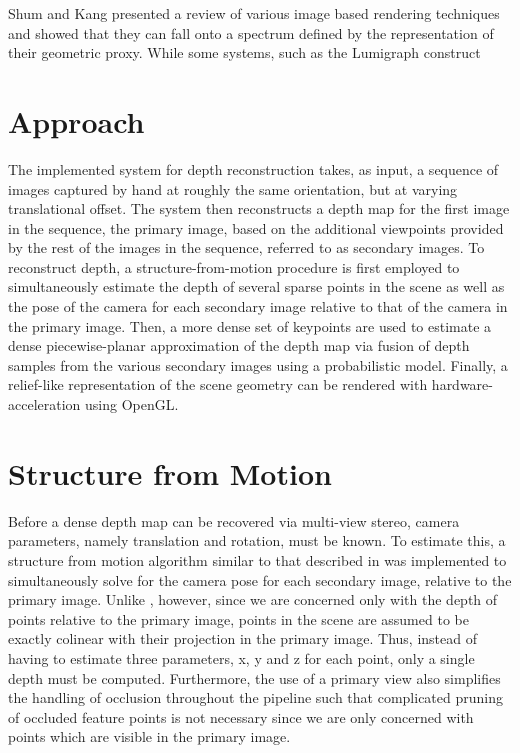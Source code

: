 \documentclass[conference]{acmsiggraph}
\begin{document}
Shum and Kang  presented a review of various image based
rendering techniques and showed that they can fall onto a spectrum defined
by the representation of their geometric proxy.  While some systems,
such as the Lumigraph \cite{gortler1996lumigraph} construct 

\section{Approach}

The implemented system for depth reconstruction takes, as input, a sequence
of images captured by hand at roughly the same orientation, but at varying
translational offset.  The system then reconstructs a depth map for the
first image in the sequence, the primary image, based on the additional
viewpoints provided by the rest of the images in the sequence,
referred to as secondary images.
To reconstruct depth, a structure-from-motion
procedure is first employed to simultaneously estimate the depth of several
sparse points in the scene as well as the pose of the camera
for each secondary image relative to that of the camera in the primary image.
Then, a more dense set of keypoints are used to 
estimate a dense piecewise-planar approximation of the depth map
via fusion of depth samples from the various secondary images using
a probabilistic model.
Finally, a relief-like representation of the scene geometry can be rendered
with hardware-acceleration using OpenGL.


% 

\section{Structure from Motion}

Before a dense depth map can be recovered via multi-view stereo,
camera parameters, namely translation and rotation, must be known.
To estimate this, a structure from motion algorithm similar to that
described in \cite{snavely2006photo} was implemented to
simultaneously solve for the camera pose for each secondary image,
relative to the primary image.
Unlike \cite{snavely2006photo}, however, since we are concerned
only with the depth of points relative to the primary image,
points in the scene are assumed to be exactly colinear with
their projection in the primary image.  Thus, instead of having
to estimate three parameters, x, y and z for each point,
only a single depth must be computed.  Furthermore, the use
of a primary view also simplifies the handling of occlusion throughout
the pipeline such that complicated pruning of occluded feature points
is not necessary since we are only concerned with points which
are visible in the primary image.
\end{document}

